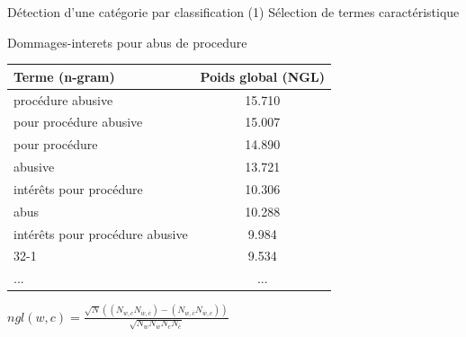 \documentclass[newPxFont,pagenumber]{beamer}
\begin{document}

\begin{frame}{Détection d'une catégorie par classification}
(1) Sélection de termes caractéristique
\begin{exampleblock}{Dommages-interets pour abus de procedure}
\small
\begin{tabular}{l|c}
\textbf{Terme (n-gram)} & \textbf{Poids global (NGL)}  \\ \hline
\midrule
procédure abusive & 15.710 \\ \hline
pour procédure abusive & 15.007 \\ \hline
pour procédure & 14.890 \\ \hline
abusive & 13.721 \\ \hline
intérêts pour procédure & 10.306 \\ \hline
abus & 10.288 \\ \hline
intérêts pour procédure abusive & 9.984 \\ \hline
32-1 & 9.534\\ \hline
... & ...
\end{tabular}
\end{exampleblock}
$ngl(w,c) = \frac{\sqrt{N} ((N_{w,c} N_{\overline{w},\overline{c}}) - (N_{w,\overline{c}} N_{\overline{w},c}))}{\sqrt{N_w N_{\overline{w}} N_c N_{\overline{c}}}}$ \cite{ng1997ngl}
\end{frame}

\end{document}
